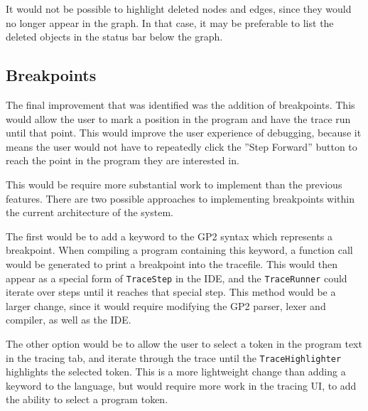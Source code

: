 \documentclass[authoryearcitations]{UoYCSproject}
\begin{document}
It would not be possible to highlight deleted nodes and edges, since they would
no longer appear in the graph. In that case, it may be preferable to list the
deleted objects in the status bar below the graph.

\subsection{Breakpoints}
\label{sec:FWBreakpoints}

The final improvement that was identified was the addition of breakpoints. This
would allow the user to mark a position in the program and have the trace run
until that point. This would improve the user experience of debugging, because
it means the user would not have to repeatedly click the ''Step Forward'' button
to reach the point in the program they are interested in.

This would be require more substantial work to implement than the previous
features. There are two possible approaches to implementing breakpoints within
the current architecture of the system.

The first would be to add a keyword to the GP2 syntax which represents a
breakpoint. When compiling a program containing this keyword, a function call
would be generated to print a breakpoint into the tracefile. This would then
appear as a special form of \texttt{TraceStep} in the IDE, and the \texttt{TraceRunner}
could iterate over steps until it reaches that special step. This method would
be a larger change, since it would require modifying the GP2 parser, lexer and
compiler, as well as the IDE.

The other option would be to allow the user to select a token in the program
text in the tracing tab, and iterate through the trace until the \texttt{TraceHighlighter}
highlights the selected token. This is a more lightweight change than adding
a keyword to the language, but would require more work in the tracing UI, to 
add the ability to select a program token.

\clearpage



\end{document}
